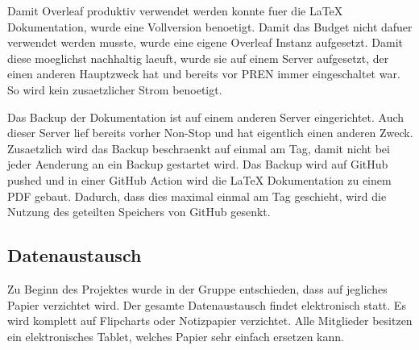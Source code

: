 Damit Overleaf produktiv verwendet werden konnte fuer die LaTeX Dokumentation, wurde eine Vollversion benoetigt. Damit das Budget nicht dafuer verwendet werden musste, wurde eine eigene Overleaf Instanz aufgesetzt. Damit diese moeglichst nachhaltig laeuft, wurde sie auf einem Server aufgesetzt, der einen anderen Hauptzweck hat und bereits vor PREN immer eingeschaltet war. So wird kein zusaetzlicher Strom benoetigt.

Das Backup der Dokumentation ist auf einem anderen Server eingerichtet. Auch dieser Server lief bereits vorher Non-Stop und hat eigentlich einen anderen Zweck. Zusaetzlich wird das Backup beschraenkt auf einmal am Tag, damit nicht bei jeder Aenderung an ein Backup gestartet wird. Das Backup wird auf GitHub pushed und in einer GitHub Action wird die LaTeX Dokumentation zu einem PDF gebaut. Dadurch, dass dies maximal einmal am Tag geschieht, wird die Nutzung des geteilten Speichers von GitHub gesenkt.

\subsection{Datenaustausch}

Zu Beginn des Projektes wurde in der Gruppe entschieden, dass auf jegliches Papier verzichtet wird. Der gesamte Datenaustausch findet elektronisch statt. Es wird komplett auf Flipcharts oder Notizpapier verzichtet. Alle Mitglieder besitzen ein elektronisches Tablet, welches Papier sehr einfach ersetzen kann.